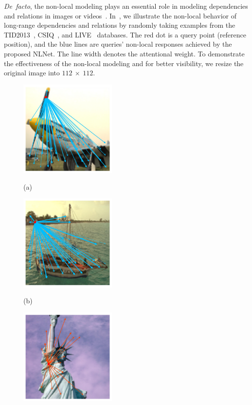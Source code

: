 	\textit{De~facto}, the non-local modeling plays an essential role in modeling dependencies and relations in images or videos~\citep{wang2018non}. In~, we illustrate the non-local behavior of long-range dependencies and relations by randomly taking examples from the TID2013~\citep{ponomarenko2015image}, CSIQ~\citep{larson2010most}, and LIVE~\citep{livedataset} databases. The red dot is a query point (reference position), and the blue lines are queries' non-local responses achieved by the proposed NLNet. The line width denotes the attentional weight. To demonstrate the effectiveness of the non-local modeling and for better visibility, we resize the original image into $112~\times~112$.
	\begin{figure}[ht]
		\centering
		\begin{minipage}[t]{.32\linewidth}
			\includegraphics[width=1.9in]{fig/jet_superpixel_crop.jpg}
			\centerline{(a)}
		\end{minipage}
		\begin{minipage}[t]{.32\linewidth}
			\includegraphics[width=1.9in]{fig/I06_superpixel.jpg}
			\centerline{(b)}
		\end{minipage}
		\begin{minipage}[t]{.32\linewidth}
			\includegraphics[width=1.9in]{fig/lady_superpixel.jpg}

\end{minipage}
\end{figure}
